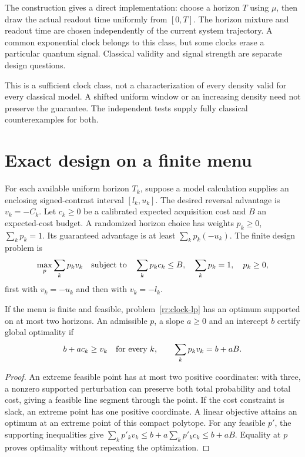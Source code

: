 The construction gives a direct implementation: choose a horizon $T$ using
$\mu$, then draw the actual readout time uniformly from $[0,T]$. The horizon
mixture and readout time are chosen independently of the current system
trajectory. A common exponential clock belongs to this class, but some clocks
erase a particular quantum signal. Classical validity and signal strength
are separate design questions.

This is a sufficient clock class, not a characterization of every density
valid for every classical model. A shifted uniform window or an increasing
density need not preserve the guarantee. The independent tests supply fully
classical counterexamples for both.

\section{Exact design on a finite menu}
For each available uniform horizon $T_k$, suppose a model calculation supplies
an enclosing signed-contrast interval $[l_k,u_k]$. The desired reversal
advantage is $v_k=-C_k$. Let $c_k\geq0$ be a calibrated expected acquisition
cost and $B$ an expected-cost budget. A randomized horizon choice has weights
$p_k\geq0$, $\sum_kp_k=1$. Its guaranteed advantage is at least
$\sum_kp_k(-u_k)$. The finite design problem is
\begin{equation}\label{rr:clock-lp}
 \max_p\sum_kp_k v_k\quad\hbox{subject to}\quad
 \sum_kp_kc_k\leq B,\quad \sum_kp_k=1,\quad p_k\geq0,
\end{equation}
first with $v_k=-u_k$ and then with $v_k=-l_k$.

\begin{proposition}
If the menu is finite and feasible, problem~\eqref{rr:clock-lp} has an optimum
supported on at most two horizons. An admissible $p$, a slope $a\geq0$ and an
intercept $b$ certify global optimality if
\[
 b+a c_k\geq v_k\quad\hbox{for every }k,
 \qquad\sum_kp_kv_k=b+aB.
\]
\end{proposition}
\begin{proof}
An extreme feasible point has at most two positive coordinates: with three,
a nonzero supported perturbation can preserve both total probability and
total cost, giving a feasible line segment through the point. If the cost
constraint is slack, an extreme point has one positive coordinate. A linear
objective attains an optimum at an extreme point of this compact polytope.
For any feasible $p'$, the supporting inequalities give
$\sum_kp'_kv_k\leq b+a\sum_kp'_kc_k\leq b+aB$. Equality at $p$ proves
optimality without repeating the optimization.
\end{proof}

